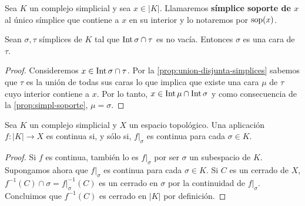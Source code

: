 \begin{definicion}
	Sea $K$ un complejo simplicial y sea $x \in |K|$. Llamaremos \textbf{símplice
		soporte de $x$} al único símplice que contiene a $x$ en su interior y lo notaremos
	por $\operatorname{sop}(x)$.
\end{definicion}
%
%

\begin{corolario}
	\label{cor:simpl-soporte} Sean $\sigma, \tau$ símplices de $K$ tal que $\operatorname{Int}
	\sigma \cap \tau$ es no vacía. Entonces $\sigma$ es una cara de $\tau$.
\end{corolario}
\begin{proof}
	Consideremos $x \in \operatorname{Int} \sigma \cap \tau$. Por la
	\autoref{prop:union-disjunta-simplices} sabemos que $\tau$ es la unión de
	todas sus caras lo que implica que existe una cara $\mu$ de $\tau$ cuyo
	interior contiene a $x$. Por lo tanto,
	$x \in \operatorname{Int} \mu \cap \operatorname{Int} \sigma$ y como consecuencia de la
	\autoref{prop:simpl-soporte}, $\mu = \sigma$.
\end{proof}
\begin{lema}
	\label{lem:cont_poly} Sea $K$ un complejo simplicial y $X$ un espacio topológico.
	Una aplicación $f: |K| \rightarrow X$ es continua si, y sólo si, $f|_{\sigma}$
	es continua para cada $\sigma \in K$.
\end{lema}
\begin{proof}
	Si $f$ es continua, también lo es $f|_{\sigma}$ por ser $\sigma$ un subespacio
	de $K$. Supongamos ahora que $f|_{\sigma}$ es continua para cada $\sigma \in K$.
	Si $C$ es un cerrado de $X$, $f^{-1}(C) \cap \sigma = f|_{\sigma}^{-1}(C)$ es un
	cerrado en $\sigma$ por la continuidad de $f|_{\sigma}$. Concluimos que
	$f^{-1}(C)$ es cerrado en $|K|$ por definición.
\end{proof}

